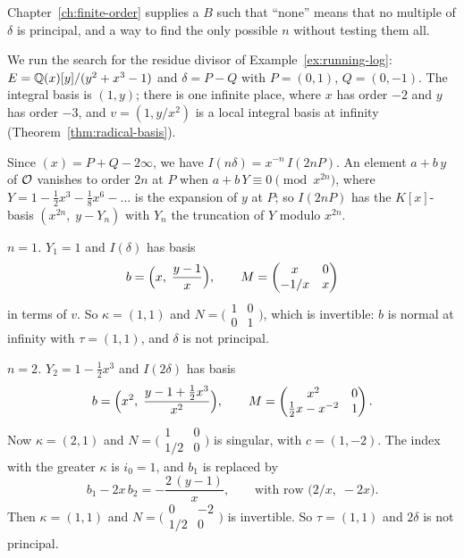 Chapter~\ref{ch:finite-order} supplies a $B$ such that ``none'' means that no
multiple of $\delta$ is principal, and a way to find the only possible $n$
without testing them all.

\begin{example}\label{ex:principal-running}
We run the search for the residue divisor of
Example~\ref{ex:running-log}: $E = \mathbb{Q}(x)[y]/(y^2 + x^3 - 1)$ and $\delta = P -
Q$ with $P = (0, 1)$, $Q = (0, -1)$. The integral basis is $(1, y)$; there is
one infinite place, where $x$ has order $-2$ and $y$ has order $-3$, and
$v = (1, y/x^2)$ is a local integral basis at infinity
(Theorem~\ref{thm:radical-basis}).

Since $(x) = P + Q - 2\infty$, we have $I(n\delta) = x^{-n}\, I(2n P)$. An
element $a + b\,y$ of $\mathcal{O}$ vanishes to order $2n$ at $P$ when $a + b\,Y
\equiv 0 \pmod{x^{2n}}$, where $Y = 1 - \frac12 x^3 - \frac18 x^6 - \dots$ is
the expansion of $y$ at $P$; so $I(2nP)$ has the $K[x]$-basis $(x^{2n},\; y -
Y_n)$ with $Y_n$ the truncation of $Y$ modulo $x^{2n}$.

\emph{$n = 1$.} $Y_1 = 1$ and $I(\delta)$ has basis
\[
  b = \Bigl( x,\; \frac{y - 1}{x} \Bigr),
  \qquad M = \begin{pmatrix} x & 0 \\ -1/x & x \end{pmatrix}
\]
in terms of $v$. So $\kappa = (1, 1)$ and $N = \bigl(\begin{smallmatrix} 1 &
0 \\ 0 & 1 \end{smallmatrix}\bigr)$, which is invertible: $b$ is normal at
infinity with $\tau = (1, 1)$, and $\delta$ is not principal.

\emph{$n = 2$.} $Y_2 = 1 - \frac12 x^3$ and $I(2\delta)$ has basis
\[
  b = \Bigl( x^2,\; \frac{y - 1 + \frac12 x^3}{x^2} \Bigr),
  \qquad M = \begin{pmatrix} x^2 & 0 \\ \frac12 x - x^{-2} & 1 \end{pmatrix} .
\]
Now $\kappa = (2, 1)$ and $N = \bigl(\begin{smallmatrix} 1 & 0 \\ 1/2 & 0
\end{smallmatrix}\bigr)$ is singular, with $c = (1, -2)$. The index with the
greater $\kappa$ is $i_0 = 1$, and $b_1$ is replaced by
\[
  b_1 - 2x\, b_2 = -\frac{2\,(y - 1)}{x},
  \qquad\text{with row } \bigl( 2/x,\; -2x \bigr) .
\]
Then $\kappa = (1, 1)$ and $N = \bigl(\begin{smallmatrix} 0 & -2 \\ 1/2 & 0
\end{smallmatrix}\bigr)$ is invertible. So $\tau = (1, 1)$ and $2\delta$ is
not principal.


\end{example}
